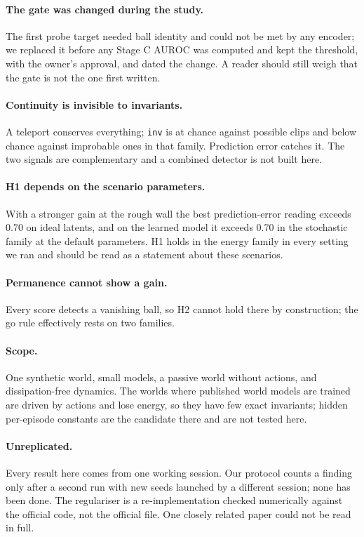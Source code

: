 \documentclass[11pt]{article}
\begin{document}
\paragraph{The gate was changed during the study.} The first probe target needed ball identity and
could not be met by any encoder; we replaced it before any Stage C AUROC was computed and kept the
threshold, with the owner's approval, and dated the change. A reader should still weigh that the gate
is not the one first written.

\paragraph{Continuity is invisible to invariants.} A teleport conserves everything; \texttt{inv} is at
chance against possible clips and below chance against improbable ones in that family. Prediction
error catches it. The two signals are complementary and a combined detector is not built here.

\paragraph{H1 depends on the scenario parameters.} With a stronger gain at the rough wall the best
prediction-error reading exceeds 0.70 on ideal latents, and on the learned model it exceeds 0.70 in
the stochastic family at the default parameters. H1 holds in the energy family in every setting we
ran and should be read as a statement about these scenarios.

\paragraph{Permanence cannot show a gain.} Every score detects a vanishing ball, so H2 cannot hold
there by construction; the go rule effectively rests on two families.

\paragraph{Scope.} One synthetic world, small models, a passive world without actions, and
dissipation-free dynamics. The worlds where published world models are trained are driven by actions
and lose energy, so they have few exact invariants; hidden per-episode constants are the candidate
there and are not tested here.

\paragraph{Unreplicated.} Every result here comes from one working session. Our protocol counts a
finding only after a second run with new seeds launched by a different session; none has been done.
The regulariser is a re-implementation checked numerically against the official code, not the
official file. One closely related paper \citep{shang2015concurrent} could not be read in full.
\end{document}

